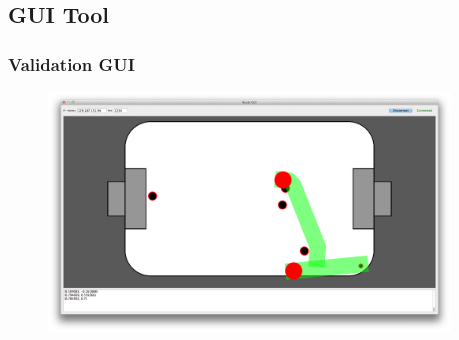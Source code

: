 \documentclass[hyperref={pdfpagelabels=false},compress]{beamer}
\begin{document}
\subsection{GUI Tool}
\begin{frame}
    \frametitle{Validation GUI}
    \begin{figure}
        \center
        \includegraphics[width=0.95\textwidth]{Pictures/gui-big}
    \end{figure}

\end{frame}
\end{document}
